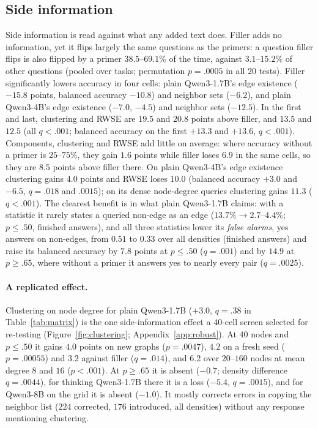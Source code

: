 \documentclass[11pt]{article}
\begin{document}
\subsection{Side information}
Side information is read against what any added text does. Filler adds no information, yet it flips largely the same questions as the primers: a question filler flips is also flipped by a primer $38.5$--$69.1\%$ of the time, against $3.1$--$15.2\%$ of other questions (pooled over tasks; permutation $p=.0005$ in all $20$ tests). %
Filler significantly lowers accuracy in four cells: plain Qwen3-1.7B's edge existence ($-15.8$ points, balanced accuracy $-10.8$) and neighbor sets ($-6.2$), and plain Qwen3-4B's edge existence ($-7.0$, $-4.5$) and neighbor sets ($-12.5$). %
In the first and last, clustering and RWSE are $19.5$ and $20.8$ points above filler, and $13.5$ and $12.5$ (all $q<.001$; balanced accuracy on the first $+13.3$ and $+13.6$, $q<.001$). %
Components, clustering and RWSE add little on average: where accuracy without a primer is $25$--$75\%$, they gain $1.6$ points while filler loses $6.9$ in the same cells, %
so they are $8.5$ points above filler there. On plain Qwen3-4B's edge existence clustering gains $4.0$ points and RWSE loses $10.0$ (balanced accuracy $+3.0$ and $-6.5$, $q=.018$ and $.0015$); %
on its dense node-degree queries clustering gains $11.3$ ($q<.001$). %
The clearest benefit is in what plain Qwen3-1.7B claims: with a statistic it rarely states a queried non-edge as an edge ($13.7\%\to2.7$--$4.4\%$; $p\leq.50$, finished answers), %
and all three statistics lower its \emph{false alarms}, yes answers on non-edges, from $0.51$ to $0.33$ over all densities (finished answers) %
and raise its balanced accuracy by $7.8$ points at $p\leq.50$ ($q=.001$) and by $14.9$ at $p\geq.65$, where without a primer it answers yes to nearly every pair ($q=.0025$). %

\paragraph{A replicated effect.} Clustering on node degree for plain Qwen3-1.7B ($+3.0$, $q=.38$ in Table~\ref{tab:matrix}) is the one side-information effect a $40$-cell screen selected for re-testing (Figure~\ref{fig:clustering}; Appendix~\ref{app:robust}). At $40$ nodes and $p\leq.50$ it gains $4.0$ points on new graphs ($p=.0047$), $4.2$ on a fresh seed ($p=.00055$) and $3.2$ against filler ($q=.014$), and $6.2$ over $20$--$160$ nodes at mean degree $8$ and $16$ ($p<.001$). %
At $p\geq.65$ it is absent ($-0.7$; density difference $q=.0044$), for thinking Qwen3-1.7B there it is a loss ($-5.4$, $q=.0015$), and for Qwen3-8B on the grid it is absent ($-1.0$). %
It mostly corrects errors in copying the neighbor list ($224$ corrected, $176$ introduced, all densities) without any response mentioning clustering. %
\end{document}
